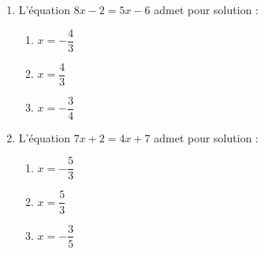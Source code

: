 \begin{enumerate}
    \item L'équation $8x-2=5x-6$ admet pour solution :
    \begin{enumerate}
        \item $x=-\dfrac{4}{3}$
        \item $x=\dfrac{4}{3}$
        \item $x=-\dfrac{3}{4}$
    \end{enumerate}
    \item L'équation $7x+2=4x+7$ admet pour solution :
    \begin{enumerate}
        \item $x=-\dfrac{5}{3}$
        \item $x=\dfrac{5}{3}$
        \item $x=-\dfrac{3}{5}$
    \end{enumerate}
\end{enumerate}